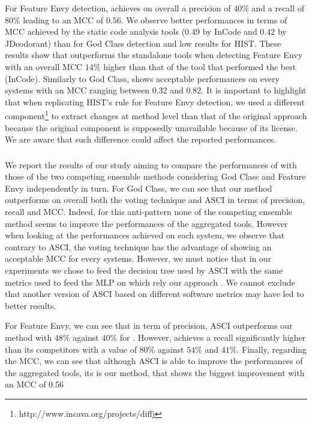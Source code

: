 For Feature Envy detection, \NAME{} achieves on overall a precision of $40\%$ and a recall of $80\%$ leading to an MCC of $0.56$. We observe better performances in terms of MCC achieved by the static code analysis tools ($0.49$ by InCode and $0.42$ by JDeodorant) than for God Class detection and low results for HIST. These results show that \NAME{} outperforms the standalone tools when detecting Feature Envy with an overall MCC $14\%$ higher than that of the tool that performed the best (InCode). Similarly to God Class, \NAME{} shows acceptable performances on every systems with an MCC ranging between $0.32$ and $0.82$. It is important to highlight that when replicating HIST's rule for Feature Envy detection, we used a different component\footnote{http://www.incava.org/projects/diffj} to extract changes at method level than that of the original approach because the original component is supposedly unavailable because of its license. We are aware that such difference could affect the reported performances.


\subsubsection{\RQtwo{}}
We report the results of our study aiming to compare the performances of \NAME{} with those of the two competing ensemble methods considering God Class and Feature Envy independently in turn. For God Class, we can see that our method outperforms on overall both the voting technique and ASCI in terms of precision, recall and MCC. Indeed, for this anti-pattern none of the competing ensemble method seems to improve the performances of the aggregated tools. However when looking at the performances achieved on each system, we observe that contrary to ASCI, the voting technique has the advantage of showing an acceptable MCC for every systems. However, we must notice that in our experiments we chose to feed the decision tree used by ASCI with the same metrics used to feed the MLP on which rely our approach \NAME{}. We cannot exclude that another version of ASCI based on different software metrics may have led to better results.

For Feature Envy, we can see that in term of precision, ASCI outperforms our method with $48\%$ against $40\%$ for \NAME{}. However, \NAME{} achieves a recall significantly higher than its competitors with a value of $80\%$ against $54\%$ and $41\%$. Finally, regarding the MCC, we can see that although ASCI is able to improve the performances of the aggregated tools, its is our method, \NAME{} that shows the biggest improvement with an MCC of $0.56$



